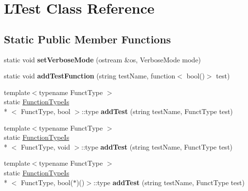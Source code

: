\hypertarget{class_l_test}{\section{L\-Test Class Reference}
\label{class_l_test}
}
\subsection*{Static Public Member Functions}
\begin{DoxyCompactItemize}
\item 
\hypertarget{class_l_test_af5b3eae6c08705345a7b62f42e500af6}{static void {\bfseries set\-Verbose\-Mode} (ostream \&os, Verbose\-Mode mode)}\label{class_l_test_af5b3eae6c08705345a7b62f42e500af6}

\item 
\hypertarget{class_l_test_acec66e13084163dc332fa8625fea15ad}{static void {\bfseries add\-Test\-Function} (string test\-Name, function$<$ bool()$>$ test)}\label{class_l_test_acec66e13084163dc332fa8625fea15ad}

\item 
\hypertarget{class_l_test_af81433247aeea95a4c4a91fcbd346f1b}{{\footnotesize template$<$typename Funct\-Type $>$ }\\static \hyperlink{struct_function_type_is}{Function\-Type\-Is}\\*
$<$ Funct\-Type, bool $>$\-::type {\bfseries add\-Test} (string test\-Name, Funct\-Type test)}\label{class_l_test_af81433247aeea95a4c4a91fcbd346f1b}

\item 
\hypertarget{class_l_test_a1d39640bf6cb3ac3d70e9a15844d6c0a}{{\footnotesize template$<$typename Funct\-Type $>$ }\\static \hyperlink{struct_function_type_is}{Function\-Type\-Is}\\*
$<$ Funct\-Type, void $>$\-::type {\bfseries add\-Test} (string test\-Name, Funct\-Type test)}\label{class_l_test_a1d39640bf6cb3ac3d70e9a15844d6c0a}

\item 
\hypertarget{class_l_test_aeafc0fc8923a866fa9df271cc25014ab}{{\footnotesize template$<$typename Funct\-Type $>$ }\\static \hyperlink{struct_function_type_is}{Function\-Type\-Is}\\*
$<$ Funct\-Type, bool($\ast$)()$>$\-::type {\bfseries add\-Test} (string test\-Name, Funct\-Type test)}\label{class_l_test_aeafc0fc8923a866fa9df271cc25014ab}


\end{DoxyCompactItemize}
